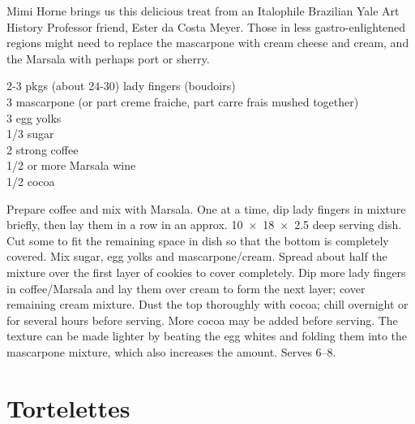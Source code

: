 \begin{open}
  Mimi Horne brings us this delicious treat from an Italophile Brazilian Yale Art History Professor friend, Ester da Costa Meyer.  Those in less gastro-enlightened regions might need to replace the mascarpone with cream cheese and cream, and the Marsala with perhaps port or sherry.
\end{open}
\begin{ingredients}
  2-3 pkgs (about 24-30) lady fingers (boudoirs) \\
  \SI{3}{\cup} mascarpone (or part creme fraiche, part carre frais mushed together)\\
  3 egg yolks \\
  \SI{1/3}{\cup} sugar \\
  \SI{2}{\cup} strong coffee \\
  \SI{1/2}{\cup} or more Marsala wine \\
  \SI{1/2}{\cup} cocoa
\end{ingredients}
Prepare coffee and mix with Marsala. One at a time, dip lady fingers in
mixture briefly, then lay them in a row in an approx. \SI{10x18x2.5}{\inch}
deep serving dish.  Cut some to fit the remaining space in dish so that the
bottom is completely covered. Mix sugar, egg yolks and
mascarpone/cream. Spread about half the mixture over the first layer of
cookies to cover completely.  Dip more lady fingers in coffee/Marsala and lay
them over cream to form the next layer; cover remaining cream mixture. Dust
the top thoroughly with cocoa; chill overnight or for several hours before
serving. More cocoa may be added before serving. The texture can be made
lighter by beating the egg whites and folding them into the mascarpone
mixture, which also increases the amount.  Serves \numrange{6}{8}.

\section{Tortelettes}

